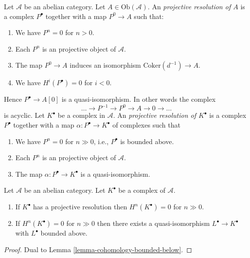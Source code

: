 \begin{definition}
\label{definition-projective-resolution}
Let $\mathcal{A}$ be an abelian category.
Let $A \in \text{Ob}(\mathcal{A})$.
An {\it projective resolution of $A$} is a complex
$P^\bullet$ together with a map $P^0 \to A$ such
that:
\begin{enumerate}
\item We have $P^n = 0$ for $n > 0$.
\item Each $P^n$ is an projective object of $\mathcal{A}$.
\item The map $P^0 \to A$ induces an isomorphism $\text{Coker}(d^{-1}) \to A$.
\item We have $H^i(P^\bullet) = 0$ for $i < 0$.
\end{enumerate}
Hence $P^\bullet \to A[0]$ is a quasi-isomorphism.
In other words the complex
$$
\ldots \to P^{-1} \to P^0 \to A \to 0 \to \ldots
$$
is acyclic. Let $K^\bullet$ be a complex in $\mathcal{A}$.
An {\it projective resolution of $K^\bullet$} is a complex
$P^\bullet$ together with a map $\alpha : P^\bullet \to K^\bullet$
of complexes such that
\begin{enumerate}
\item We have $P^n = 0$ for $n \gg 0$, i.e., $P^\bullet$ is bounded above.
\item Each $P^n$ is an projective object of $\mathcal{A}$.
\item The map $\alpha : P^\bullet \to K^\bullet$ is a
quasi-isomorphism.
\end{enumerate}
\end{definition}

\begin{lemma}
\label{lemma-cohomology-bounded-above}
Let $\mathcal{A}$ be an abelian category.
Let $K^\bullet$ be a complex of $\mathcal{A}$.
\begin{enumerate}
\item If $K^\bullet$ has a projective resolution then
$H^n(K^\bullet) = 0$ for $n \gg 0$.
\item If $H^n(K^\bullet) = 0$ for $n \gg 0$ then there
exists a quasi-isomorphism $L^\bullet \to K^\bullet$
with $L^\bullet$ bounded above.
\end{enumerate}
\end{lemma}

\begin{proof}
Dual to
Lemma \ref{lemma-cohomology-bounded-below}.
\end{proof}

